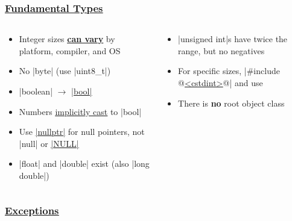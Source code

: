 \documentclass[glossy]{beamer}
\newcommand{\cppref}[2]{\href{http://en.cppreference.com/w/cpp/#1}{\underline{#2}}}
\newcommand{\refer}[1]{([shift={(.25em,.25em)}]pic cs:#1)}
\begin{document}

\begin{frame}[fragile=singleslide]
  \frametitle{\cppref{language/types}{Fundamental Types}}
  \begin{columns}[t]
    \begin{column}{6cm}
      \begin{itemize}
        \item Integer sizes \cppref{language/types\#Data_models}{\textbf{can vary}} by platform, compiler, and OS
        \item No \javainline|byte| (use \cppinline|uint8_t|)
        \item \javainline|boolean| $\rightarrow$ \cppref{language/types\#Boolean_type}{\cppinline|bool|}
        \item Numbers \cppref{language/implicit_cast}{implicitly cast} to \cppinline|bool|
        \item Use \cppref{language/nullptr}{\cppinline|nullptr|} for null pointers, not \javainline|null| or \cppref{types/NULL}{\cppinline|NULL|}
        \item \cppinline|float| and \cppinline|double| exist (also \cppinline|long double|)
      \end{itemize}
    \end{column}

    \begin{column}{6cm}
      \begin{itemize}
        \item \cppinline|unsigned int|s have twice the range, but no negatives
        \item For specific sizes, \cppinline|#include @\cppref{preprocessor/include}{<cstdint>}@| and use 
        \item There is \textbf{no} root object class
      \end{itemize}
    \end{column}
  \end{columns}
\end{frame}


\begin{frame}[fragile=singleslide]
  \frametitle{\cppref{language/exceptions}{Exceptions}}
  

\end{frame}
\end{document}
